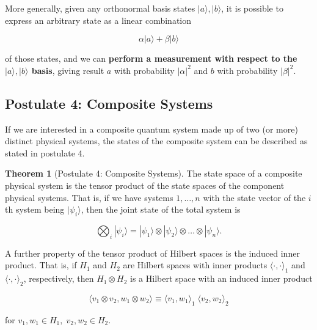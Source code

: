 \documentclass{article}
\theoremstyle{definition}
\newtheorem{theorem}{Theorem}[section]
\begin{document}
      More generally, given any orthonormal basis states $|a \rangle, |b \rangle$, it is possible to express an arbitrary state as a linear combination

        \[ \alpha |a \rangle + \beta |b \rangle \]

      of those states, and we can \textbf{perform a measurement with respect to the $|a\rangle, |b\rangle$ basis}, giving result $a$ with probability $|\alpha|^2$ and $b$ with probability $|\beta|^2$.
  

  \subsection{Postulate 4: Composite Systems}

    If we are interested in a composite quantum system made up of two (or more) distinct physical systems, the states of the composite system can be described as stated in postulate 4. 

    \begin{theorem}[Postulate 4: Composite Systems]
      The state space of a composite physical system is the tensor product of the state spaces of the component physical systems. That is, if we have systems $1, \ldots, n$ with the state vector of the $i$th system being $|\psi_i \rangle$, then the joint state of the total system is

        \[\bigotimes_i |\psi_i \rangle = |\psi_1 \rangle \otimes |\psi_2 \rangle \otimes \ldots \otimes |\psi_n \rangle.\]
    \end{theorem}

    A further property of the tensor product of Hilbert spaces is the induced inner product. That is, if $H_1$ and $H_2$ are Hilbert spaces with inner products $\langle \cdot, \cdot \rangle_1$ and $\langle \cdot, \cdot \rangle_2$, respectively, then $H_1 \otimes H_2$ is a Hilbert space with an induced inner product

      \[\langle v_1 \otimes v_2 , w_1 \otimes w_2 \rangle \equiv \langle v_1, w_1\rangle_1 \; \langle v_2, w_2 \rangle_2\]

    for $v_1, w_1 \in H_1, \; v_2, w_2 \in H_2$. 
\end{document}
